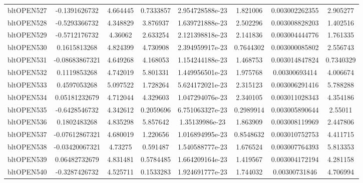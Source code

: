 \documentclass[11pt]{report}
\begin{document}
\begin{sidewaystable}
{\begin{tabular}{|l|c|c|c|c|c|c|c|}
    bltOPEN527   & -0.1391626732   &      4.664445   &     0.7333857   & 2.954728588e-23   &      1.821006   & 0.003002262355   &      2.905277\\
    bltOPEN528   & -0.5293366732   &      4.348829   &      3.876937   & 1.639721888e-23   &      2.502296   & 0.003008828203   &      1.402516\\
    bltOPEN529   & -0.5712176732   &       4.36062   &      2.633254   & 2.121398818e-23   &      2.141836   & 0.003004444776   &      1.761335\\
    bltOPEN530   &  0.1615813268   &      4.824399   &      4.730908   & 2.394959917e-23   &     0.7644302   & 0.003000085802   &      2.556743\\
    bltOPEN531   & -0.08683867321   &      4.649268   &      4.168053   & 1.154244188e-23   &      1.468753   & 0.003014847824   &     0.7340329\\
    bltOPEN532   &  0.1119853268   &      4.742019   &      5.801331   & 1.449956501e-23   &      1.975768   & 0.00300693414   &      4.006674\\
    bltOPEN533   &  0.4597053268   &      5.097522   &      1.728264   & 5.624172021e-23   &      2.315123   & 0.003006291416   &      5.788288\\
    bltOPEN534   & 0.05181232679   &      4.712044   &      4.329603   & 1.047294076e-23   &      2.340105   & 0.003011028343   &      4.354186\\
    bltOPEN535   & -0.6428546732   &      4.342612   &     0.2059696   & 6.751063327e-23   &     0.2989914   & 0.003005890644   &       2.55011\\
    bltOPEN536   &  0.1802483268   &      4.835298   &      5.857642   & 1.35139986e-23   &      1.863909   & 0.003008119969   &      2.447806\\
    bltOPEN537   & -0.07612867321   &      4.680019   &      1.220656   & 1.016894995e-23   &     0.8548632   & 0.003010752753   &      4.411715\\
    bltOPEN538   & -0.03420067321   &       4.73275   &      0.591487   & 1.540588777e-23   &      1.676524   & 0.003007764393   &      5.813353\\
    bltOPEN539   & 0.06482732679   &      4.831481   &     0.5784485   & 1.664209164e-23   &      1.419567   & 0.003004172194   &      4.281158\\
    bltOPEN540   & -0.3287426732   &      4.525711   &     0.1533283   & 1.924691777e-23   &      1.744032   & 0.00300731846   &      4.706994\\

\end{tabular}}
\end{sidewaystable}
\end{document}
